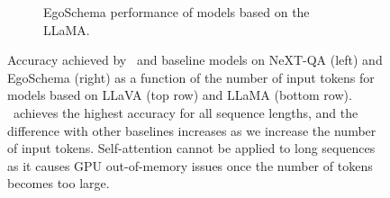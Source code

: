 \begin{figure}[t]
\begin{subfigure}[b]{0.48\textwidth}
    \caption{EgoSchema performance of models based on the LLaMA.}
\end{subfigure}
\vspace{-2mm}
\caption{\small{Accuracy achieved by \model\ and baseline models on NeXT-QA (left) and EgoSchema (right) as a function of the number of input tokens for models based on LLaVA (top row) and LLaMA (bottom row). \model\ achieves the highest accuracy for all sequence lengths, and the difference with other baselines increases as we 
increase the number of input tokens. Self-attention cannot be applied to long sequences as it causes GPU out-of-memory issues once the number of tokens becomes too large.}}
\vspace{-5mm}
\label{fig:performance1}
\end{figure}

